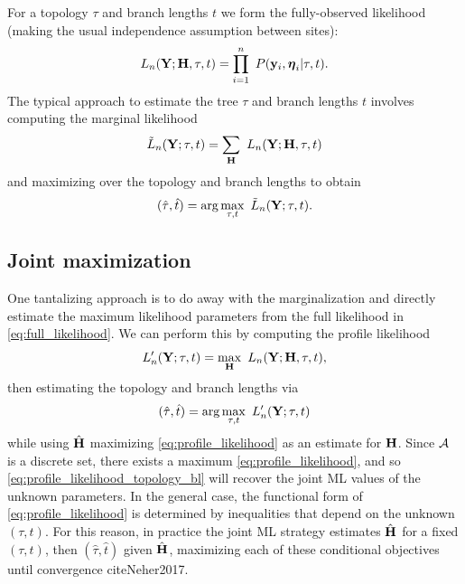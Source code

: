 \documentclass[a4paper]{article}
\begin{document}
For a topology $\tau$ and branch lengths $t$ we form the fully-observed likelihood (making the usual independence assumption between sites):
\begin{equation}
\label{eq:full_likelihood}
L_n(\fullAlignment;\fullAncestralStates, \tau, t) = \prod_{i=1}^{n} \ P(\alignmentColumn_i, \ancestralStateColumn_i | \tau, t).
\end{equation}
The typical approach to estimate the tree $\tau$ and branch lengths $t$ involves computing the marginal likelihood
\begin{equation}
\label{eq:marginal_likelihood}
\tilde{L}_n(\fullAlignment; \tau, t) = \sum_{\fullAncestralStates} \ L_n(\fullAlignment;\fullAncestralStates, \tau, t)
\end{equation}
and maximizing over the topology and branch lengths to obtain
$$
(\hat{\tau}, \hat{t}) = \arg\max_{\tau, t} \  \tilde{L}_n(\mathbf{Y}; \tau, t).
$$

\subsection{Joint maximization}

One tantalizing approach is to do away with the marginalization and directly estimate the maximum likelihood parameters from the full likelihood in \eqref{eq:full_likelihood}.
We can perform this by computing the profile likelihood
\begin{equation}
\label{eq:profile_likelihood}
L_n'(\fullAlignment;\tau, t) = \max_{\fullAncestralStates} \ L_n(\fullAlignment;\fullAncestralStates, \tau, t),
\end{equation}
then estimating the topology and branch lengths via
\begin{equation}
\label{eq:profile_likelihood_topology_bl}
(\hat{\tau}, \hat{t}) = \arg\max_{\tau, t} \ L_n'(\mathbf{Y};\tau, t)
\end{equation}
while using $\hat{\mathbf{H}}$ maximizing \eqref{eq:profile_likelihood} as an estimate for $\mathbf{H}$.
Since $\mathcal{A}$ is a discrete set, there exists a maximum \eqref{eq:profile_likelihood}, and so \eqref{eq:profile_likelihood_topology_bl} will recover the joint ML values of the unknown parameters.
In the general case, the functional form of \eqref{eq:profile_likelihood} is determined by inequalities that depend on the unknown $(\tau,t)$.
For this reason, in practice the joint ML strategy estimates $\hat{\mathbf{H}}$ for a fixed $(\tau,t)$, then $(\hat{\tau},\hat{t})$ given $\hat{\mathbf{H}}$, maximizing each of these conditional objectives until convergence cite{Neher2017}.
\end{document}
